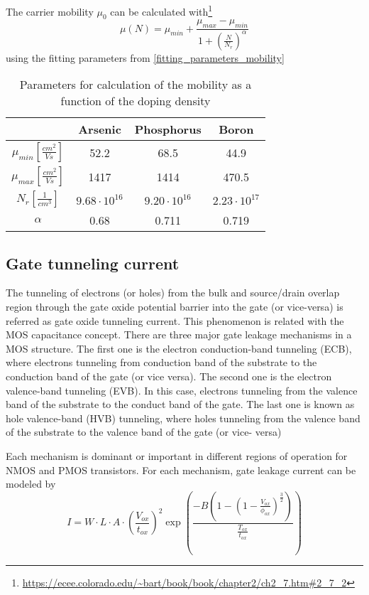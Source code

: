 The carrier mobility $ \mu_0$ can be calculated with\footnote{\url{https://ecee.colorado.edu/\~bart/book/book/chapter2/ch2_7.htm\#2_7_2}}
\begin{equation}
 \mu(N) =  \mu_{min} + \frac{ \mu_{max}- \mu_{min}}{1+\left(\frac{N}{N_r}\right)^\alpha}
\end{equation}
using the fitting parameters from \autoref{fitting_parameters_mobility}

\begin{table}[H]
	\centering
	\begin{tabular}{|c|c|c|c|}
		\hline
		{} &
		\textbf{Arsenic} &	
		\textbf{Phosphorus} &
		\textbf{Boron} \\
		\hline
		$\mu_{min} [\frac{cm^2}{Vs}]$ &
		52.2 &
		68.5 &		
		44.9 \\
		\hline
		$\mu_{max} [\frac{cm^2}{Vs}]$ &
		1417 &
		1414 &
		470.5 \\
		\hline
		$N_r [\frac{1}{cm^3}]$ &
		$9.68 \cdot 10^{16}$ &
		$9.20 \cdot 10^{16}$ &
		$2.23 \cdot 10^{17}$ \\
		\hline
		$\alpha$ &
		0.68 &
		0.711 &
		0.719 \\
		\hline
	\end{tabular}
	\caption{Parameters for calculation of the mobility as a function of the doping density}
	\label{fitting_parameters_mobility}
\end{table}

\subsection{Gate tunneling current}

The tunneling of electrons (or holes) from the bulk and source/drain overlap region through the gate oxide potential barrier into the gate (or vice-versa) is referred as gate oxide tunneling current.
This phenomenon is related with the MOS capacitance concept.
There are three major gate leakage mechanisms in a MOS structure.
The first one is the electron conduction-band tunneling (ECB), where electrons tunneling from conduction band of the substrate to the conduction band of the gate (or vice versa).
The second one is the electron valence-band tunneling (EVB). In this case, electrons tunneling from the valence band of the substrate to the conduct band of the gate.
The last one is known as hole valence-band (HVB) tunneling, where holes tunneling from the valence band of the substrate to the valence band of the gate (or vice- versa)

Each mechanism is dominant or important in different regions of operation for NMOS and PMOS transistors. For each mechanism, gate leakage current can be modeled by
\begin{equation}
I = W \cdot L \cdot A \cdot \left(\frac{V_{ox}}{t_{ox}}\right)^2\exp\left(\frac{-B\left(1-\left(1-\frac{V_{ox}}{\phi_{ox}}\right)^{\frac{3}{2}}\right)}{\frac{T_{ox}}{t_{ox}}}\right)
\end{equation}
